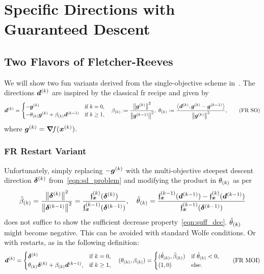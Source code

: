 \documentclass{article}
\theoremstyle{plain}
\theoremstyle{definition}
\begin{document}
\section{Specific Directions with Guaranteed Descent}

\subsection{Two Flavors of Fletcher-Reeves}
We will show two fun variants derived from 
the single-objective scheme in~\cite{zhangGlobalConvergenceModified2006}.
The directions $\bm{d}^{(k)}$ are inspired by the
classical \ac{fr} recipe and given by
\begin{equation}
	\bm{d}^{(k)} = 
	\begin{cases}
		-\bm{g}^{(k)}
		&\text{if $k=0$},
		\\
		-\theta_{(k)}\bm{g}^{(k)}
		+ 
		\beta_{(k)}
		\bm{d}^{(k-1)}
		&\text{if $k\geq 1$,}
	\end{cases}
	\quad
	\beta_{(k)}
	:= 
	\frac{\left\|\bm{g}^{(k)}\right\|^2}{\left\|\bm{g}^{(k-1)}\right\|^2},
	\;
	\theta_{(k)}
	:=
	\frac{
		\left\langle \bm{d}^{(k)}, \bm{g}^{(k)} - \bm{g}^{(k-1)} \right\rangle
		}{
			\left\|\bm{g}^{(k)}\right\|^2
		},
		\tag{FR~SO}
		\label{eqn:frSO}
\end{equation}
where $\bm{g}^{(k)} = \bm{\nabla}\!f(\bm{x}^{(k)})$.

\subsubsection*{FR Restart Variant}
Unfortunately, simply replacing $-\bm{g}^{(k)}$ 
with the multi-objective steepest descent direction
$\bm{\delta}^{(k)}$ from~\eqref{eqn:sd_problem} and modifying 
the product in $\theta_{(k)}$ as per
\begin{equation}
	\tilde{\beta}_{(k)} 
	= 
	\frac{
		\left\|\bm{\delta}^{(k)}\right\|^2
	}{
		\left\|\bm{\delta}^{(k-1)}\right\|^2
	}
	=
	\frac{\mathfrak{f}_{\bm{x}}^{(k)}(\bm{\delta}^{(k)})}{\mathfrak{f}_{\bm{x}}^{(k-1)}(\bm{\delta}^{(k-1)})},
	\quad
	\tilde{\theta}_{(k)}
	=
	\frac{
		\mathfrak{f}_{\bm{x}}^{(k-1)}(\bm{d}^{(k-1)})
		-
		\mathfrak{f}_{\bm{x}}^{(k)}(\bm{d}^{(k-1)})
	}{
		\mathfrak{f}_{\bm{x}}^{(k-1)}(\bm{\delta}^{(k-1)})
	}
	\label{eqn:hyposulphurousTontiners}
\end{equation}
does not suffice to show the sufficient decrease property~\eqref{eqn:suff_dec}.
$\tilde{\theta}_{(k)}$ might become negative.
This can be avoided with standard Wolfe conditions.
Or with restarts, as in the following definition:
\begin{equation}
	\bm{d}^{(k)}
	=
	\begin{cases}
		\bm{\delta}^{(k)}
		&\text{if $k = 0$},
		\\
		\theta_{(k)} \bm{\delta}^{(k)} + \beta_{(k)} \bm{d}^{(k-1)},
		&\text{if $k \geq 1$,}
	\end{cases}
	\quad
	(\theta_{(k)}, \beta_{(k)})
	= 
	\begin{cases}	
		(\tilde\theta_{(k)}, \tilde\beta_{(k)})
		&\text{if $\tilde\theta_{(k)} < 0$,}
		\\
		(1, 0)
		&\text{else.}
	\end{cases}
	\tag{FR~MOI}
	\label{eqn:frMO1}
\end{equation}
\end{document}
